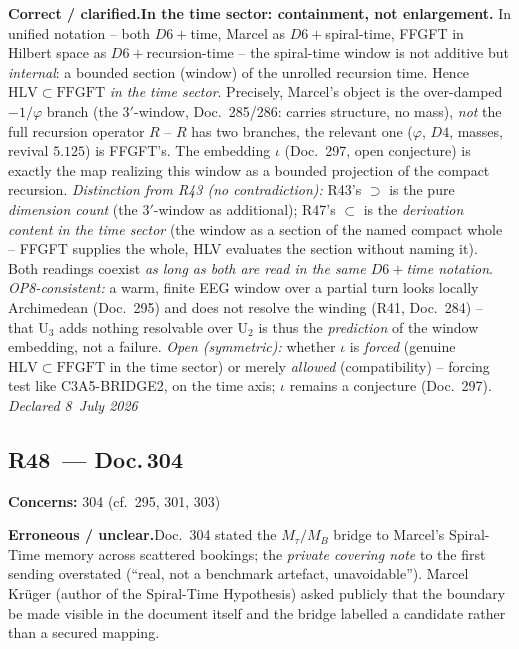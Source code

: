 \smallskip\noindent\textbf{Correct / clarified.}\quad \textbf{In the time sector: containment, not enlargement.} In unified notation -- both $D6+$time, Marcel as $D6+$spiral-time, FFGFT in Hilbert space as $D6+$recursion-time -- the spiral-time window is not additive but \emph{internal}: a bounded section (window) of the unrolled recursion time. Hence $\mathrm{HLV}\subset\mathrm{FFGFT}$ \emph{in the time sector}. Precisely, Marcel's object is the over-damped $-1/\varphi$ branch (the $3'$-window, Doc.~285/286: carries structure, no mass), \emph{not} the full recursion operator $R$ -- $R$ has two branches, the relevant one ($\varphi$, $D4$, masses, revival $5{.}125$) is FFGFT's. The embedding $\iota$ (Doc.~297, open conjecture) is exactly the map realizing this window as a bounded projection of the compact recursion. \emph{Distinction from R43 (no contradiction):} R43's $\supset$ is the pure \emph{dimension count} (the $3'$-window as additional); R47's $\subset$ is the \emph{derivation content in the time sector} (the window as a section of the named compact whole -- FFGFT supplies the whole, HLV evaluates the section without naming it). Both readings coexist \emph{as long as both are read in the same $D6+$time notation}. \emph{OP8-consistent:} a warm, finite EEG window over a partial turn looks locally Archimedean (Doc.~295) and does not resolve the winding (R41, Doc.~284) -- that U$_3$ adds nothing resolvable over U$_2$ is thus the \emph{prediction} of the window embedding, not a failure. \emph{Open (symmetric):} whether $\iota$ is \emph{forced} (genuine $\mathrm{HLV}\subset\mathrm{FFGFT}$ in the time sector) or merely \emph{allowed} (compatibility) -- forcing test like C3A5-BRIDGE2, on the time axis; $\iota$ remains a conjecture (Doc.~297).    \emph{Declared 8~July 2026}


\medskip


\subsection*{R48~--- Doc.\,304}

\noindent\textbf{Concerns:} 304 (cf.\ 295, 301, 303)


\smallskip\noindent\textbf{Erroneous / unclear.}\quad Doc.~304 stated the $M_\tau/M_B$ bridge to Marcel's Spiral-Time memory across scattered bookings; the \emph{private covering note} to the first sending overstated (\enquote{real, not a benchmark artefact, unavoidable}). Marcel Krüger (author of the Spiral-Time Hypothesis) asked publicly that the boundary be made visible in the document itself and the bridge labelled a candidate rather than a secured mapping.


